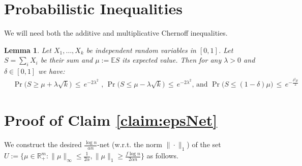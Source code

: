 \documentclass{article}
\newcommand{\E}{\mathbb{E}}
\newcommand{\R}{\mathbb{R}}
\newcommand{\xv}[0]{\mathbf{x}}
\newtheorem{lemma}{Lemma}[section]
\begin{document}

\appendix


\section{Probabilistic Inequalities} \label{app:prob}

We will need both the additive and multiplicative Chernoff inequalities. 

\begin{lemma} \cite{vershynin2018high} \label{lemma:chernoff}
    Let $X_1,\ldots,X_k$ be independent random variables in $[0,1]$. Let $S = \sum_i X_i$ be their sum and $\mu := \E S$  its expected value. Then for any $\lambda > 0$ and $\delta \in [0,1]$ we have:
    \begin{align*}
        &\Pr\big(S \ge \mu + \lambda \sqrt{k}\big) \,\le\, e^{- 2\lambda^2}  \textrm{ , } \Pr\big(S \le \mu - \lambda \sqrt{k} \big) \,\le\, e^{- 2\lambda^2}  \textrm{, and } \Pr\big(S \le (1-\delta) \mu \big) \,\le\, e^{- \frac{\delta^2 \mu}{2}}          
    \end{align*}
\end{lemma}


\section{Proof of Claim \ref{claim:epsNet}} \label{app:epsNet}

We construct the desired $\frac{\log n}{\alpha n}$-net (w.r.t. the norm $\|\cdot\|_1$) of the set $U := \{ \mu \in \R^m_+ : \|\mu\|_{\infty} \le \frac{1}{2\alpha}, \|\mu\|_1 \ge \frac{f \log n}{2 \alpha n}\}$ as follows. 
\end{document}
